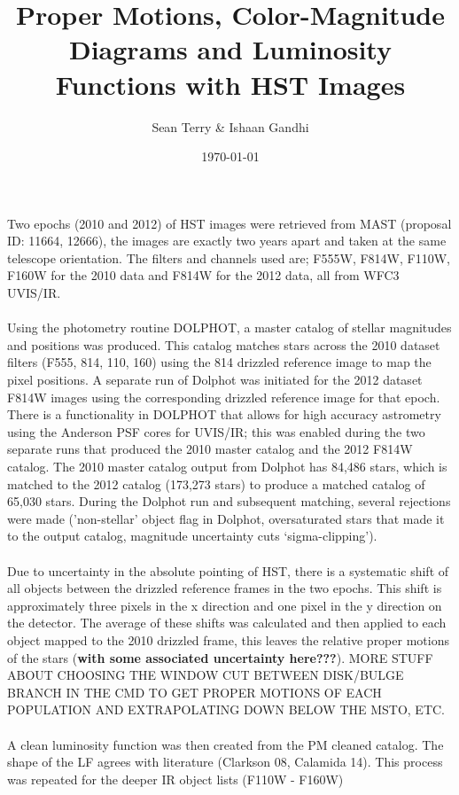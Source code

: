 \documentclass[12pt]{article}
\begin{document}
\date{\today}
\title{Proper Motions, Color-Magnitude Diagrams and Luminosity Functions with HST Images}
\author{Sean Terry \& Ishaan Gandhi} 
 
\maketitle

\section*{}
Two epochs (2010 and 2012) of HST images were retrieved from MAST (proposal ID: 11664, 12666), the images are exactly two years apart and taken at the same telescope orientation. The filters and channels used are; F555W, F814W, F110W, F160W for the 2010 data and F814W for the 2012 data, all from WFC3 UVIS/IR.
\\
\\
\indent Using the photometry routine DOLPHOT, a master catalog of stellar magnitudes and positions was produced. This catalog matches stars across the 2010 dataset filters (F555, 814, 110, 160) using the 814 drizzled reference image to map the pixel positions. A separate run of Dolphot was initiated for the 2012 dataset F814W images using the corresponding drizzled reference image for that epoch. There is a functionality in DOLPHOT that allows for high accuracy astrometry using the Anderson PSF cores for UVIS/IR; this was enabled during the two separate runs that produced the 2010 master catalog and the 2012 F814W catalog. The 2010 master catalog output from Dolphot has 84,486 stars, which is matched to the 2012 catalog (173,273 stars) to produce a matched catalog of 65,030 stars. During the Dolphot run and subsequent matching, several rejections were made ('non-stellar' object flag in Dolphot, oversaturated stars that made it to the output catalog, magnitude uncertainty cuts `sigma-clipping').
\\
\\
\indent Due to uncertainty in the absolute pointing of HST, there is a systematic shift of all objects between the drizzled reference frames in the two epochs. This shift is approximately three pixels in the x direction and one pixel in the y direction on the detector. The average of these shifts was calculated and then applied to each object mapped to the 2010 drizzled frame, this leaves the relative proper motions of the stars (\textbf{with some associated uncertainty here???}). MORE STUFF ABOUT CHOOSING THE WINDOW CUT BETWEEN DISK/BULGE BRANCH IN THE CMD TO GET PROPER MOTIONS OF EACH POPULATION AND EXTRAPOLATING DOWN BELOW THE MSTO, ETC.
\\
\\
\indent A clean luminosity function was then created from the PM cleaned catalog. The shape of the LF agrees with literature (Clarkson 08, Calamida 14). This process was repeated for the deeper IR object lists (F110W - F160W)



 
\end{document}
